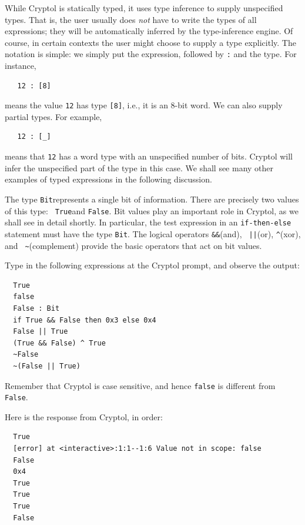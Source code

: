 While Cryptol is statically typed, it uses type inference to supply
unspecified types.  That is, the user usually does {\em not} have to
write the types of all expressions; they will be automatically inferred by the
type-inference engine.  Of course, in certain contexts the user might
choose to supply a type explicitly.  The notation is simple: we simply
put the expression, followed by {\tt :} and the type. For instance,
\begin{Verbatim}
   12 : [8]
\end{Verbatim}
means the value {\tt 12} has type {\tt [8]}, i.e., it is an 8-bit
word. We can also supply partial types. For example,
\begin{Verbatim}
   12 : [_]
\end{Verbatim}
means that \texttt{12} has a word type with an unspecified number of
bits. Cryptol will infer the unspecified part of the type in this
case. We shall see many other examples of typed expressions in the
following discussion.


The type {\tt Bit}\indTheBitType represents a single bit of
information. There are precisely two values of this type: {\tt
  True}\indTrue and {\tt False}\indFalse. Bit values play an important
role in Cryptol, as we shall see in detail shortly. In particular, the
test expression in an {\tt if-then-else} statement must have the type
{\tt Bit}.  The logical operators {\tt \&\&}\indAnd (and), {\tt
  ||}\indOr (or), {\tt \Verb|^|}\indXOr (xor), and {\tt
  \Verb|~|}\indComplement (complement) provide the basic operators
that act on bit values.

\begin{Exercise}\label{ex:dataBit}
  Type in the following expressions at the Cryptol prompt, and observe
  the output:
\begin{Verbatim}
  True
  false
  False : Bit
  if True && False then 0x3 else 0x4
  False || True
  (True && False) ^ True
  ~False
  ~(False || True)
\end{Verbatim}
Remember that Cryptol is case sensitive, and hence {\tt false} is
different from {\tt False}.\indCaseSensitive
\end{Exercise}
\begin{Answer}
Here is the response from Cryptol, in order:
\begin{small}
\begin{Verbatim}
  True
  [error] at <interactive>:1:1--1:6 Value not in scope: false
  False
  0x4
  True
  True
  True
  False
\end{Verbatim}
\end{small}
\end{Answer}

